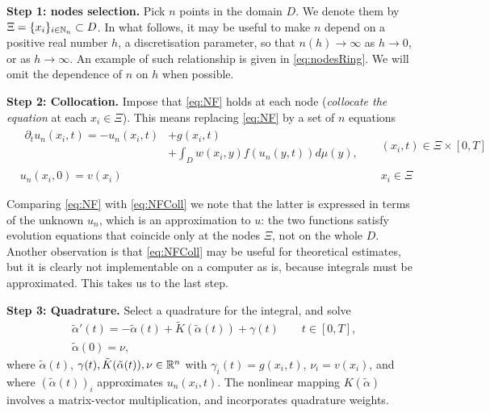 \documentclass[a4paper]{siamart190516}
\begin{document}
\textbf{Step 1: nodes selection.} Pick $n$ points in the domain $D$. We denote them by
$\Xi = \{ x_i \}_{i \in \mathbb{N}_n} \subset D$. In what follows, it may be useful to
make $n$ depend on a positive real number $h$, a discretisation parameter, so that
$n(h) \to \infty$ as $h \to 0$, or as $h \to \infty$. An example of such relationship
is given in \cref{eq:nodesRing}. We will omit the dependence of $n$ on $h$ when
possible. 

\textbf{Step 2: Collocation.} 
Impose that \cref{eq:NF} holds at each node (\textit{collocate the equation} at
each $x_i \in \Xi$). This means replacing \cref{eq:NF} by a set of $n$ equations
\begin{equation}\label{eq:NFColl}
  \begin{aligned}
  &
  \begin{aligned}
    \partial_t u_n(x_i,t) =  -u_n(x_i,t) &+ g(x_i,t) \\
                & + \int_{D} w(x_i,y) f(u_n(y,t))d \mu(y),
  \end{aligned}
  && (x_i,t) \in \Xi \times [0,T] \\
  & u_n(x_i,0) = v(x_i) && x_i \in \Xi 
  \end{aligned}
\end{equation}

Comparing \cref{eq:NF} with \cref{eq:NFColl} we note that the latter is expressed in
terms of the unknown $u_n$, which is an approximation to $u$: the two functions
satisfy evolution equations that coincide only at the nodes $\Xi$, not on the whole $D$.
Another observation is that \cref{eq:NFColl} may be useful for theoretical
estimates, but it is clearly not implementable on a computer as is, because integrals must be
approximated. This takes us to the last step.
  
\textbf{Step 3: Quadrature.} Select a quadrature for the integral, and solve
\begin{equation}\label{eq:NFODEQuad}
  \begin{aligned}
   & \tilde \alpha'(t) = -\tilde \alpha(t) + \tilde K(\tilde \alpha(t)) + \gamma(t) \qquad  t \in [0,T],\\ 
   & \tilde \alpha (0) = \nu,
  \end{aligned}
\end{equation}  
where $\tilde \alpha(t)$, $\gamma(t), \tilde K(\tilde \alpha(t)), \nu \in \mathbb{R}^n$ with
$\gamma_i(t) = g(x_i,t)$, $\nu_i = v(x_i)$, and where $(\tilde \alpha(t))_i$
approximates $u_n(x_i,t)$. The nonlinear mapping $K(\tilde \alpha)$ involves a matrix-vector
multiplication, and incorporates quadrature weights.
\end{document}
